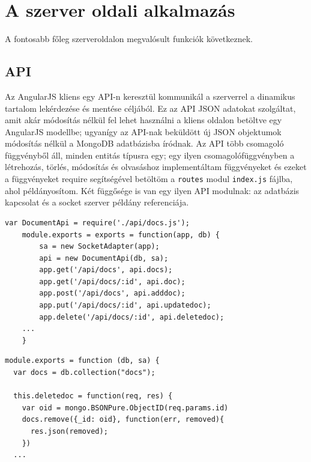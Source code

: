 \section{A szerver oldali alkalmazás}

A fontosabb főleg szerveroldalon megvalósult funkciók következnek.

\subsection{API}

Az AngularJS kliens egy API-n keresztül kommunikál a szerverrel a dinamikus tartalom lekérdezése és mentése céljából. Ez az API JSON adatokat szolgáltat, amit akár módosítás nélkül fel lehet használni a kliens oldalon betöltve egy AngularJS modellbe; ugyanígy az API-nak beküldött új JSON objektumok módosítás nélkül a MongoDB adatbázisba íródnak. Az API több csomagoló függvényből áll, minden entitás típusra egy; egy ilyen csomagolófüggvényben a létrehozás, törlés, módosítás és olvasáshoz implementáltam függvényeket és ezeket a függvényeket require segítségével betöltöm a \lstinline{routes} modul \lstinline{index.js} fájlba, ahol példányosítom. Két függősége is van egy ilyen API modulnak: az adatbázis kapcsolat és a socket szerver példány referenciája.

\begin{lstlisting}[caption=API végpontok bekötése az alkalmazás URL szabályai közé]
    var DocumentApi = require('./api/docs.js');
    module.exports = exports = function(app, db) {
        sa = new SocketAdapter(app);
        api = new DocumentApi(db, sa);
        app.get('/api/docs', api.docs);
        app.get('/api/docs/:id', api.doc);
        app.post('/api/docs', api.adddoc);
        app.put('/api/docs/:id', api.updatedoc);
        app.delete('/api/docs/:id', api.deletedoc);
    ...
    }

\end{lstlisting}

\begin{lstlisting}[caption=Diagram API és annak egy metódusa]
module.exports = function (db, sa) {
  var docs = db.collection("docs");

  this.deletedoc = function(req, res) {
    var oid = mongo.BSONPure.ObjectID(req.params.id)
    docs.remove({_id: oid}, function(err, removed){
      res.json(removed);
    })  
  ...

\end{lstlisting}

